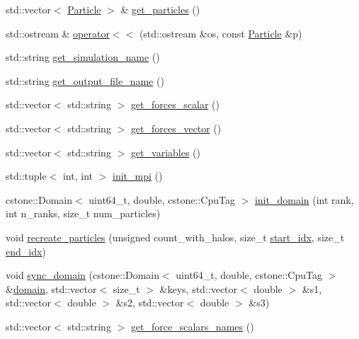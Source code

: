 \begin{DoxyCompactItemize}
\item 
std\+::vector$<$ \mbox{\hyperlink{classwash_1_1Particle}{Particle}} $>$ \& \mbox{\hyperlink{namespacewash_a79e2901674acaec9da9603ba4fdb12bf}{get\+\_\+particles}} ()
\item 
std\+::ostream \& \mbox{\hyperlink{namespacewash_abc2f2a24cba2a641e3a2177b85b20953}{operator$<$$<$}} (std\+::ostream \&os, const \mbox{\hyperlink{classwash_1_1Particle}{Particle}} \&p)
\item 
std\+::string \mbox{\hyperlink{namespacewash_ae53e7d7035c2a890e62ce7687f173222}{get\+\_\+simulation\+\_\+name}} ()
\item 
std\+::string \mbox{\hyperlink{namespacewash_a5ffed72aa633299d2cb1692076563f55}{get\+\_\+output\+\_\+file\+\_\+name}} ()
\item 
std\+::vector$<$ std\+::string $>$ \mbox{\hyperlink{namespacewash_a0cac03b47f7ed36a343e0d42aa0f013a}{get\+\_\+forces\+\_\+scalar}} ()
\item 
std\+::vector$<$ std\+::string $>$ \mbox{\hyperlink{namespacewash_a1b363919a60e27b3a13ee7eec7a3dcdb}{get\+\_\+forces\+\_\+vector}} ()
\item 
std\+::vector$<$ std\+::string $>$ \mbox{\hyperlink{namespacewash_a1c3211b3b0c5f804ecd247b159703b68}{get\+\_\+variables}} ()
\item 
std\+::tuple$<$ int, int $>$ \mbox{\hyperlink{namespacewash_a24c5e20c82921f02f79e9947f7113f70}{init\+\_\+mpi}} ()
\item 
cstone\+::\+Domain$<$ uint64\+\_\+t, double, cstone\+::\+Cpu\+Tag $>$ \mbox{\hyperlink{namespacewash_a1473dce3a353e16eae7e13990f27a9b3}{init\+\_\+domain}} (int rank, int n\+\_\+ranks, size\+\_\+t num\+\_\+particles)
\item 
void \mbox{\hyperlink{namespacewash_aba64dafc759621369351c22f65435fe6}{recreate\+\_\+particles}} (unsigned count\+\_\+with\+\_\+halos, size\+\_\+t \mbox{\hyperlink{namespacewash_a820391e694539fac01ed9916b92b427c}{start\+\_\+idx}}, size\+\_\+t \mbox{\hyperlink{namespacewash_a46edd0c40cbb3607c190c2acab5fe7b4}{end\+\_\+idx}})
\item 
void \mbox{\hyperlink{namespacewash_a075ba78df60938a5d76fe39041396f37}{sync\+\_\+domain}} (cstone\+::\+Domain$<$ uint64\+\_\+t, double, cstone\+::\+Cpu\+Tag $>$ \&\mbox{\hyperlink{namespacewash_a53e8b34558bb0851dd0c229c8d720f28}{domain}}, std\+::vector$<$ size\+\_\+t $>$ \&keys, std\+::vector$<$ double $>$ \&s1, std\+::vector$<$ double $>$ \&s2, std\+::vector$<$ double $>$ \&s3)
\item 
std\+::vector$<$ std\+::string $>$ \mbox{\hyperlink{namespacewash_aaf7c907c156c086ad032365076e04b92}{get\+\_\+force\+\_\+scalars\+\_\+names}} ()

\end{DoxyCompactItemize}
